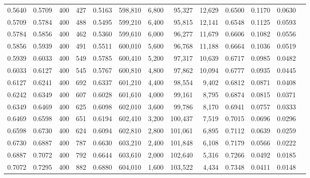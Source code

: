 \begin{tabular}{rrrrrrrrrrrrr}
0.5640 & 0.5709 &    400 &   427 &                                     0.5163 & 598,810 &   6,800 &  95,327 &  12,629 & 0.6500 & 0.1170 & 0.0630 \\
0.5709 & 0.5784 &    400 &   488 &                                     0.5495 & 599,210 &   6,400 &  95,815 &  12,141 & 0.6548 & 0.1125 & 0.0593 \\
0.5784 & 0.5856 &    400 &   462 &                                     0.5360 & 599,610 &   6,000 &  96,277 &  11,679 & 0.6606 & 0.1082 & 0.0556 \\
0.5856 & 0.5939 &    400 &   491 &                                     0.5511 & 600,010 &   5,600 &  96,768 &  11,188 & 0.6664 & 0.1036 & 0.0519 \\
0.5939 & 0.6033 &    400 &   549 &                                     0.5785 & 600,410 &   5,200 &  97,317 &  10,639 & 0.6717 & 0.0985 & 0.0482 \\
0.6033 & 0.6127 &    400 &   545 &                                     0.5767 & 600,810 &   4,800 &  97,862 &  10,094 & 0.6777 & 0.0935 & 0.0445 \\
0.6127 & 0.6241 &    400 &   692 &                                     0.6337 & 601,210 &   4,400 &  98,554 &   9,402 & 0.6812 & 0.0871 & 0.0408 \\
0.6242 & 0.6349 &    400 &   607 &                                     0.6028 & 601,610 &   4,000 &  99,161 &   8,795 & 0.6874 & 0.0815 & 0.0371 \\
0.6349 & 0.6469 &    400 &   625 &                                     0.6098 & 602,010 &   3,600 &  99,786 &   8,170 & 0.6941 & 0.0757 & 0.0333 \\
0.6469 & 0.6598 &    400 &   651 &                                     0.6194 & 602,410 &   3,200 & 100,437 &   7,519 & 0.7015 & 0.0696 & 0.0296 \\
0.6598 & 0.6730 &    400 &   624 &                                     0.6094 & 602,810 &   2,800 & 101,061 &   6,895 & 0.7112 & 0.0639 & 0.0259 \\
0.6730 & 0.6887 &    400 &   787 &                                     0.6630 & 603,210 &   2,400 & 101,848 &   6,108 & 0.7179 & 0.0566 & 0.0222 \\
0.6887 & 0.7072 &    400 &   792 &                                     0.6644 & 603,610 &   2,000 & 102,640 &   5,316 & 0.7266 & 0.0492 & 0.0185 \\
0.7072 & 0.7295 &    400 &   882 &                                     0.6880 & 604,010 &   1,600 & 103,522 &   4,434 & 0.7348 & 0.0411 & 0.0148 \\

\end{tabular}
